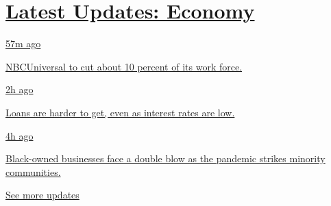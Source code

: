\hypertarget{latest-updates-economy}{%
\section{\texorpdfstring{\href{https://www.nytimes.com/live/2020/08/04/business/stock-market-today-coronavirus?action=click\&pgtype=Article\&state=default\&region=MAIN_CONTENT_1\&context=storylines_live_updates}{Latest
Updates:
Economy}}{Latest Updates: Economy}}\label{latest-updates-economy}}

\href{https://www.nytimes.com/live/2020/08/04/business/stock-market-today-coronavirus?action=click\&pgtype=Article\&state=default\&region=MAIN_CONTENT_1\&context=storylines_live_updates\#nbcuniversal-to-cut-about-10-percent-of-its-work-force}{57m
ago}

\href{https://www.nytimes.com/live/2020/08/04/business/stock-market-today-coronavirus?action=click\&pgtype=Article\&state=default\&region=MAIN_CONTENT_1\&context=storylines_live_updates\#nbcuniversal-to-cut-about-10-percent-of-its-work-force}{NBCUniversal
to cut about 10 percent of its work force.}

\href{https://www.nytimes.com/live/2020/08/04/business/stock-market-today-coronavirus?action=click\&pgtype=Article\&state=default\&region=MAIN_CONTENT_1\&context=storylines_live_updates\#loans-are-harder-to-get-even-as-interest-rates-are-low}{2h
ago}

\href{https://www.nytimes.com/live/2020/08/04/business/stock-market-today-coronavirus?action=click\&pgtype=Article\&state=default\&region=MAIN_CONTENT_1\&context=storylines_live_updates\#loans-are-harder-to-get-even-as-interest-rates-are-low}{Loans
are harder to get, even as interest rates are low.}

\href{https://www.nytimes.com/live/2020/08/04/business/stock-market-today-coronavirus?action=click\&pgtype=Article\&state=default\&region=MAIN_CONTENT_1\&context=storylines_live_updates\#black-owned-businesses-face-a-double-blow-as-the-pandemic-strikes-minority-communities}{4h
ago}

\href{https://www.nytimes.com/live/2020/08/04/business/stock-market-today-coronavirus?action=click\&pgtype=Article\&state=default\&region=MAIN_CONTENT_1\&context=storylines_live_updates\#black-owned-businesses-face-a-double-blow-as-the-pandemic-strikes-minority-communities}{Black-owned
businesses face a double blow as the pandemic strikes minority
communities.}

\href{https://www.nytimes.com/live/2020/08/04/business/stock-market-today-coronavirus?action=click\&pgtype=Article\&state=default\&region=MAIN_CONTENT_1\&context=storylines_live_updates}{See
more updates}


